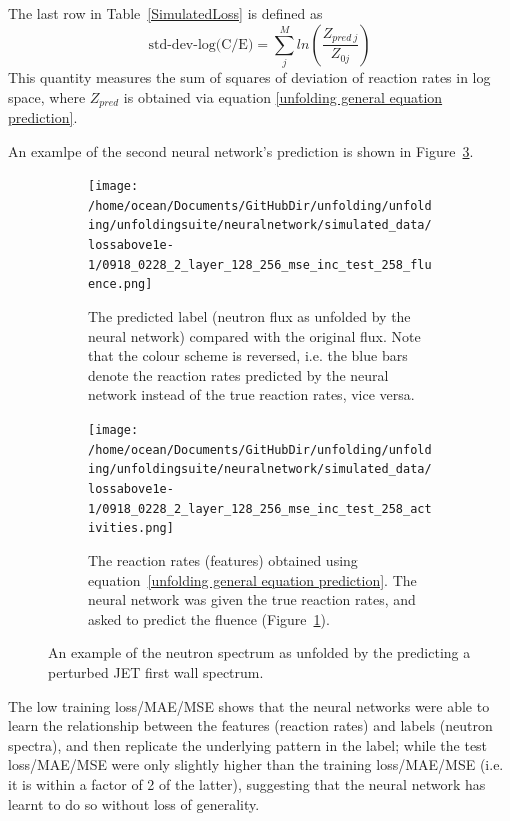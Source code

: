 \documentclass[a4paper, 12pt]{article}
\begin{document}
The last row in Table~\ref{SimulatedLoss} is defined as
\begin{equation}\label{std-dev-log(C/E)}
    \text{std-dev-log(C/E)} = \sum_j^M ln\left(\frac{Z_{pred\:j}}{Z_{0j}}\right)
\end{equation}
This quantity measures the sum of squares of deviation of reaction rates in log space,
where $Z_{pred}$ is obtained via equation \ref{unfolding general equation prediction}.

An examlpe of the second neural network's prediction is shown in Figure~\ref{SimulatedExample}.

\begin{figure}
\centering
    \begin{subfigure}[b]{11cm}
    \texttt{[image: /home/ocean/Documents/GitHubDir/unfolding/unfolding/unfoldingsuite/neuralnetwork/simulated\_data/lossabove1e-1/0918\_0228\_2\_layer\_128\_256\_mse\_inc\_test\_258\_fluence.png]}
    \caption{The predicted label (neutron flux as unfolded by the neural network) compared with the original flux. Note that the colour scheme is reversed, i.e. the blue bars denote the reaction rates predicted by the neural network instead of the true reaction rates, vice versa.}\label{SimulatedFluence}
    \end{subfigure}
    \begin{subfigure}[b]{5cm}
    \texttt{[image: /home/ocean/Documents/GitHubDir/unfolding/unfolding/unfoldingsuite/neuralnetwork/simulated\_data/lossabove1e-1/0918\_0228\_2\_layer\_128\_256\_mse\_inc\_test\_258\_activities.png]}
    \caption{The reaction rates (features) obtained using equation~\ref{unfolding general equation prediction}. The neural network was given the true reaction rates, and asked to predict the fluence (Figure~\ref{SimulatedFluence}).}\label{SimulatedActivity}
    \end{subfigure}
\caption{An example of the neutron spectrum as unfolded by the  predicting a perturbed JET first wall spectrum.} \label{SimulatedExample}
\end{figure}

The low training loss/MAE/MSE shows that the neural networks were able to learn the relationship between the features (reaction rates) and labels (neutron spectra), and then replicate the underlying pattern in the label; while the test loss/MAE/MSE were only slightly higher than the training loss/MAE/MSE (i.e. it is within a factor of 2 of the latter), suggesting that the neural network has learnt to do so without loss of generality.
\end{document}
